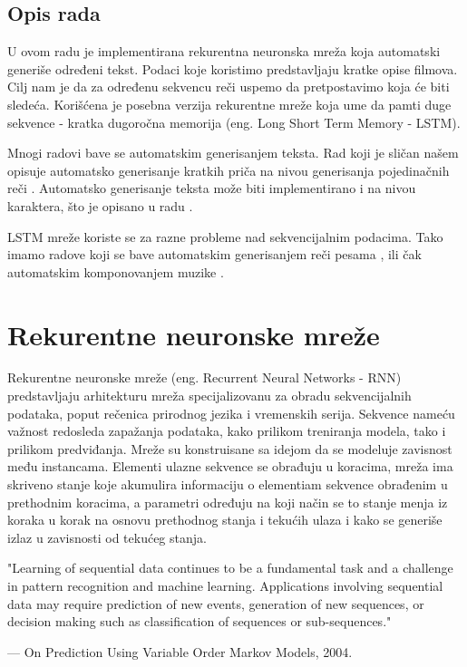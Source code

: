 \documentclass[a4paper]{article}
\begin{document}
\subsection{Opis rada}

U ovom radu je implementirana rekurentna neuronska mreža koja automatski generiše određeni tekst. Podaci koje koristimo predstavljaju kratke opise filmova. Cilj nam je da za određenu sekvencu reči uspemo da pretpostavimo koja će biti sledeća. Korišćena je posebna verzija rekurentne mreže koja ume da pamti duge sekvence - kratka dugoročna memorija (eng. Long Short Term Memory - LSTM). 

Mnogi radovi bave se automatskim generisanjem teksta. Rad koji je sličan našem opisuje automatsko generisanje kratkih priča na nivou generisanja pojedinačnih reči  \cite{pawade2018story}. Automatsko generisanje teksta može biti implementirano i na nivou karaktera, što je opisano u radu \cite{sutskever2011generating}.

LSTM mreže koriste se za razne probleme nad sekvencijalnim podacima. Tako imamo radove koji se bave automatskim generisanjem reči pesama \cite{potash2015ghostwriter}, ili čak automatskim komponovanjem muzike \cite{choi2016text}.

\section{Rekurentne neuronske mreže}
Rekurentne neuronske mreže (eng. Recurrent Neural Networks - RNN) predstavljaju arhitekturu mreža specijalizovanu za obradu sekvencijalnih podataka, poput rečenica prirodnog jezika i vremenskih serija. Sekvence nameću važnost redosleda zapažanja podataka, kako prilikom treniranja modela, tako i prilikom predviđanja. Mreže su konstruisane sa idejom da se modeluje zavisnost među instancama. Elementi ulazne sekvence se obrađuju u koracima, mreža ima skriveno stanje koje akumulira informaciju o elementiam sekvence obrađenim u prethodnim koracima, a parametri određuju na koji način se to stanje menja iz koraka u korak na osnovu prethodnog stanja i tekućih ulaza i kako se generiše izlaz u zavisnosti od tekućeg stanja.

"Learning of sequential data continues to be a fundamental task and a challenge in
pattern recognition and machine learning. Applications involving sequential data
may require prediction of new events, generation of new sequences, or decision
making such as classification of sequences or sub-sequences."

     — On Prediction Using Variable Order Markov Models, 2004.
\end{document}
